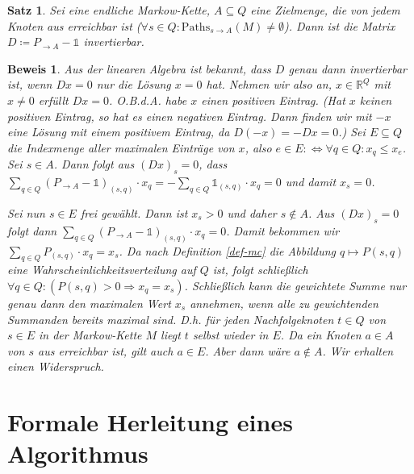 \documentclass[a4paper]{article}
\newcommand{\mc}{Markow-Kette}
\newtheorem{satz}{Satz}[section] %
\theoremstyle{nonumberplain}
\newtheorem{beweis}{Beweis}
\begin{document}
	\begin{satz}\label{th-unique}
		Sei \mcex{} eine endliche \mc, $A\subseteq Q$ eine Zielmenge, die von jedem Knoten aus erreichbar ist ($\forall s\in Q: \mathrm{Paths}_{s\rightarrow A}(M)\neq\emptyset$). 
		Dann ist die Matrix $D \coloneqq P_{\rightarrow A} - \mathbb{1}$ invertierbar.
	\end{satz}
	\begin{beweis}
		Aus der linearen Algebra ist bekannt, dass $D$ genau dann invertierbar ist, wenn $Dx = 0$ nur die Lösung $x=0$ hat.
		Nehmen wir also an, $x \in \mathbb{R}^Q$ mit $x\neq 0$ erfüllt $Dx = 0$. O.B.d.A. habe $x$ einen positiven Eintrag. (Hat $x$ keinen positiven Eintrag, so hat es einen negativen Eintrag. Dann finden wir mit $-x$ eine Lösung mit einem positivem Eintrag, da $D(-x) = - Dx = 0$.)
		Sei $E \subseteq Q$ die Indexmenge aller maximalen Einträge von $x$, also $e \in E :\Leftrightarrow \forall q \in Q : x_q \leq x_e$.
		Sei $s\in A$. Dann folgt aus $(Dx)_s = 0$, dass $\sum_{q\in Q}{(P_{\rightarrow A}- \mathbb{1})_{(s,q)} \cdot x_q} = -\sum_{q\in Q}{\mathbb{1}_{(s,q)} \cdot x_q} = 0$  und damit $x_s = 0$.
		
		Sei nun $s \in E$ frei gewählt. Dann ist $x_s > 0$ und daher $s\notin A$. Aus $(Dx)_s = 0$ folgt dann $\sum_{q\in Q}{(P_{\rightarrow A}- \mathbb{1})_{(s,q)} \cdot x_q} = 0$. Damit bekommen wir $\sum_{q\in Q}{P_{(s,q)} \cdot x_q} = x_s$. Da nach Definition \ref{def-mc} die Abbildung $q \mapsto P(s,q)$ eine Wahrscheinlichkeitsverteilung auf $Q$ ist, folgt schließlich $\forall q\in Q: (P(s,q) > 0 \Rightarrow x_q = x_s)$. Schließlich kann die gewichtete Summe nur genau dann den maximalen Wert $x_s$ annehmen, wenn alle zu gewichtenden Summanden bereits maximal sind. D.h. für jeden Nachfolgeknoten $t\in Q$ von $s\in E$ in der \mc{} $M$ liegt $t$ selbst wieder in $E$. Da ein Knoten $a\in A$ von $s$ aus erreichbar ist, gilt auch $a\in E$. Aber dann wäre $a\notin A$. Wir erhalten einen Widerspruch.
	\end{beweis}
	
	
	\section{Formale Herleitung eines Algorithmus}
	
\end{document}
